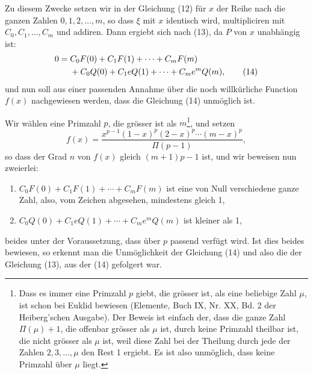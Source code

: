 \documentclass[11pt]{article}
\begin{document}
Zu diesem Zwecke setzen wir in der Gleichung (12) für $x$ der Reihe nach die ganzen Zahlen $0,1,2,\ldots,m$, so dass $\xi$ mit $x$ identisch wird, multipliciren mit $C_0,C_1,\ldots,C_m$ und addiren. Dann ergiebt sich nach (13), da $P$ von $x$ unabhängig ist:
\begin{align}
0={}&C_0F(0)+C_1F(1)+\cdots+C_mF(m)\notag\\
&+C_0Q(0)+C_1eQ(1)+\cdots+C_me^mQ(m),\tag{14}
\end{align}
und nun soll aus einer passenden Annahme über die noch willkürliche Function $f(x)$ nachgewiesen werden, dass die Gleichung (14) unmöglich ist.

Wir wählen eine Primzahl $p$, die grösser ist als $m$\footnote{Dass es immer eine Primzahl $p$ giebt, die grösser ist, als eine beliebige Zahl $\mu$, ist schon bei Euklid bewiesen (Elemente, Buch IX, Nr. XX, Bd. 2 der Heiberg'schen Ausgabe). Der Beweis ist einfach der, dass die ganze Zahl $\Pi(\mu)+1$, die offenbar grösser als $\mu$ ist, durch keine Primzahl theilbar ist, die nicht grösser als $\mu$ ist, weil diese Zahl bei der Theilung durch jede der Zahlen $2,3,\ldots,\mu$ den Rest 1 ergiebt. Es ist also unmöglich, dass keine Primzahl über $\mu$ liegt.}, und setzen
\begin{equation}\tag{15}
f(x)=\frac{x^{p-1}(1-x)^p(2-x)^p\cdots(m-x)^p}{\Pi(p-1)},
\end{equation}
so dass der Grad $n$ von $f(x)$ gleich $(m+1)p-1$ ist, und wir beweisen nun zweierlei:
\begin{enumerate}[label=\arabic*)]
\item $C_0F(0)+C_1F(1)+\cdots+C_mF(m)$ ist eine von Null verschiedene ganze Zahl, also, vom Zeichen abgesehen, mindestens gleich 1,
\item $C_0Q(0)+C_1eQ(1)+\cdots+C_me^mQ(m)$ ist kleiner als 1,
\end{enumerate}
beides unter der Voraussetzung, dass über $p$ passend verfügt wird. Ist dies beides bewiesen, so erkennt man die Unmöglichkeit der Gleichung (14) und also die der Gleichung (13), aus der (14) gefolgert war.
\end{document}
